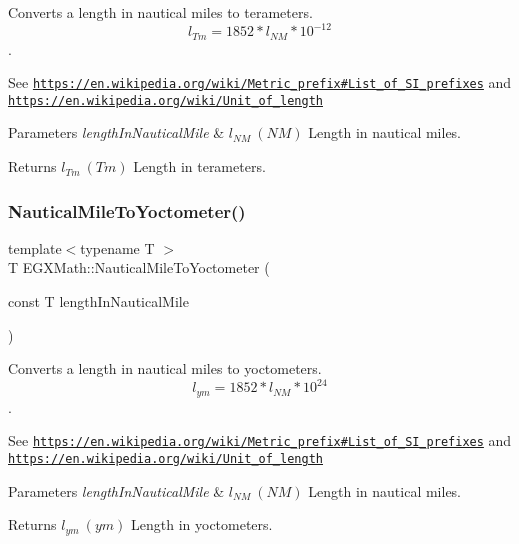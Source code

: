 Converts a length in nautical miles to terameters. \[ l_{Tm}=1852 * l_{NM} * 10^{-12} \]. 

See \href{https://en.wikipedia.org/wiki/Metric_prefix#List_of_SI_prefixes}{\tt https\+://en.\+wikipedia.\+org/wiki/\+Metric\+\_\+prefix\#\+List\+\_\+of\+\_\+\+S\+I\+\_\+prefixes} and \href{https://en.wikipedia.org/wiki/Unit_of_length}{\tt https\+://en.\+wikipedia.\+org/wiki/\+Unit\+\_\+of\+\_\+length} 
\begin{DoxyParams}{Parameters}
{\em length\+In\+Nautical\+Mile} & $ l_{NM}\ (NM)$ Length in nautical miles. \\
\hline
\end{DoxyParams}
\begin{DoxyReturn}{Returns}
$ l_{Tm}\ (Tm)$ Length in terameters. 
\end{DoxyReturn}
\mbox{\label{group___e_g_x_math-_conversions-_length_conversions-_nautical-_nautical_mile-_s_i_ga88c9ac99418bf78c790532bd414d0a89}} 
\subsubsection{\texorpdfstring{Nautical\+Mile\+To\+Yoctometer()}{NauticalMileToYoctometer()}}
{\footnotesize\ttfamily template$<$typename T $>$ \\
T E\+G\+X\+Math\+::\+Nautical\+Mile\+To\+Yoctometer (\begin{DoxyParamCaption}\item[{const T}]{length\+In\+Nautical\+Mile }\end{DoxyParamCaption})}



Converts a length in nautical miles to yoctometers. \[ l_{ym}=1852 * l_{NM} * 10^{24} \]. 

See \href{https://en.wikipedia.org/wiki/Metric_prefix#List_of_SI_prefixes}{\tt https\+://en.\+wikipedia.\+org/wiki/\+Metric\+\_\+prefix\#\+List\+\_\+of\+\_\+\+S\+I\+\_\+prefixes} and \href{https://en.wikipedia.org/wiki/Unit_of_length}{\tt https\+://en.\+wikipedia.\+org/wiki/\+Unit\+\_\+of\+\_\+length} 
\begin{DoxyParams}{Parameters}
{\em length\+In\+Nautical\+Mile} & $ l_{NM}\ (NM)$ Length in nautical miles. \\
\hline
\end{DoxyParams}
\begin{DoxyReturn}{Returns}
$ l_{ym}\ (ym)$ Length in yoctometers. 
\end{DoxyReturn}
\mbox{\label{group___e_g_x_math-_conversions-_length_conversions-_nautical-_nautical_mile-_s_i_gaae1116911eff729d693728d7757ac6eb}} 
